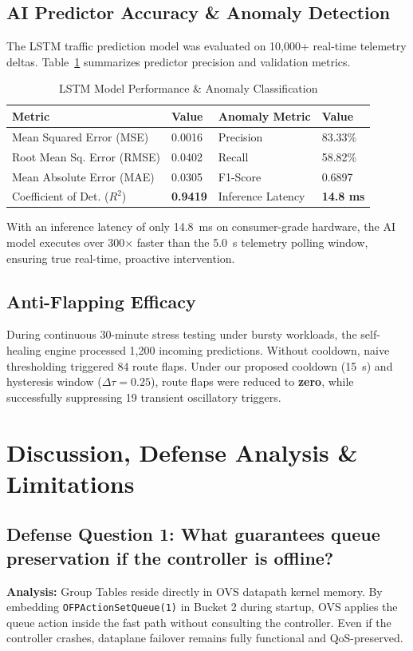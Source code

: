 \documentclass[conference]{IEEEtran}
\begin{document}
\subsection{AI Predictor Accuracy \& Anomaly Detection}
The LSTM traffic prediction model was evaluated on 10,000+ real-time telemetry deltas. Table~\ref{tab:ai_metrics} summarizes predictor precision and validation metrics.

\begin{table}[htbp]
\caption{LSTM Model Performance \& Anomaly Classification}
\begin{center}
\begin{tabular}{ll|ll}
\toprule
\textbf{Metric} & \textbf{Value} & \textbf{Anomaly Metric} & \textbf{Value} \\
\midrule
Mean Squared Error (MSE) & 0.0016 & Precision & 83.33\% \\
Root Mean Sq. Error (RMSE) & 0.0402 & Recall & 58.82\% \\
Mean Absolute Error (MAE) & 0.0305 & F1-Score & 0.6897 \\
Coefficient of Det. ($R^2$) & \textbf{0.9419} & Inference Latency & \textbf{14.8 ms} \\
\bottomrule
\end{tabular}
\label{tab:ai_metrics}
\end{center}
\end{table}

With an inference latency of only 14.8~ms on consumer-grade hardware, the AI model executes over 300$\times$ faster than the 5.0~s telemetry polling window, ensuring true real-time, proactive intervention.

\subsection{Anti-Flapping Efficacy}
During continuous 30-minute stress testing under bursty workloads, the self-healing engine processed 1,200 incoming predictions. Without cooldown, naive thresholding triggered 84 route flaps. Under our proposed cooldown (15~s) and hysteresis window ($\Delta \tau = 0.25$), route flaps were reduced to \textbf{zero}, while successfully suppressing 19 transient oscillatory triggers.

\section{Discussion, Defense Analysis \& Limitations}

\subsection{Defense Question 1: What guarantees queue preservation if the controller is offline?}
\textbf{Analysis:} Group Tables reside directly in OVS datapath kernel memory. By embedding \texttt{OFPActionSetQueue(1)} in Bucket 2 during startup, OVS applies the queue action inside the fast path without consulting the controller. Even if the controller crashes, dataplane failover remains fully functional and QoS-preserved.
\end{document}
